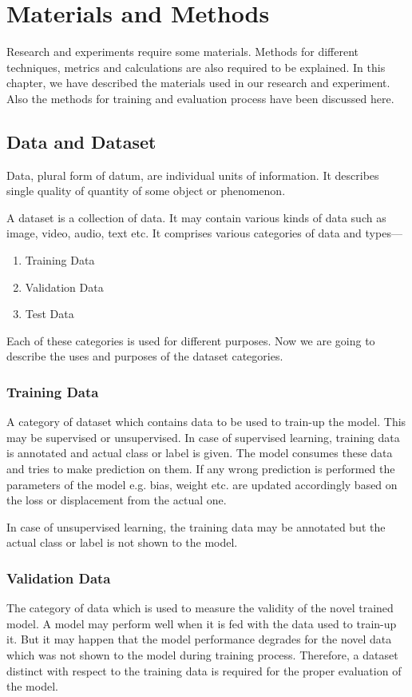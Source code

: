 \chapter{Materials and Methods}
    Research and experiments require some materials. Methods for different techniques, metrics and calculations are also required to be explained. In this chapter, we have described the materials used in our research and experiment. Also the methods for training and evaluation process have been discussed here.
    
    \section{Data and Dataset}
        Data, plural form of datum, are individual units of information. It describes single quality of quantity of some object or phenomenon.
        
        A dataset is a collection of data. It may contain various kinds of data such as image, video, audio, text etc. It comprises various categories of data and types---
        \begin{enumerate}
         \item Training Data
         \item Validation Data
         \item Test Data
        \end{enumerate}
        Each of these categories is used for different purposes. Now we are going to describe the uses and purposes of the dataset categories.
        
        \subsection{Training Data}
            A category of dataset which contains data to be used to train-up the model. This may be supervised or unsupervised. In case of supervised learning, training data is annotated and actual class or label is given. The model consumes these data and tries to make prediction on them. If any wrong prediction is performed the parameters of the model e.g. bias, weight etc. are updated accordingly based on the loss or displacement from the actual one.
            
            In case of unsupervised learning, the training data may be annotated but the actual class or label is not shown to the model.
            
        \subsection{Validation Data}
            The category of data which is used to measure the validity of the novel trained model. A model may perform well when it is fed with the data used to train-up it. But it may happen that the model performance degrades for the novel data which was not shown to the model during training process. Therefore, a dataset distinct with respect to the training data is required for the proper evaluation of the model.
            
